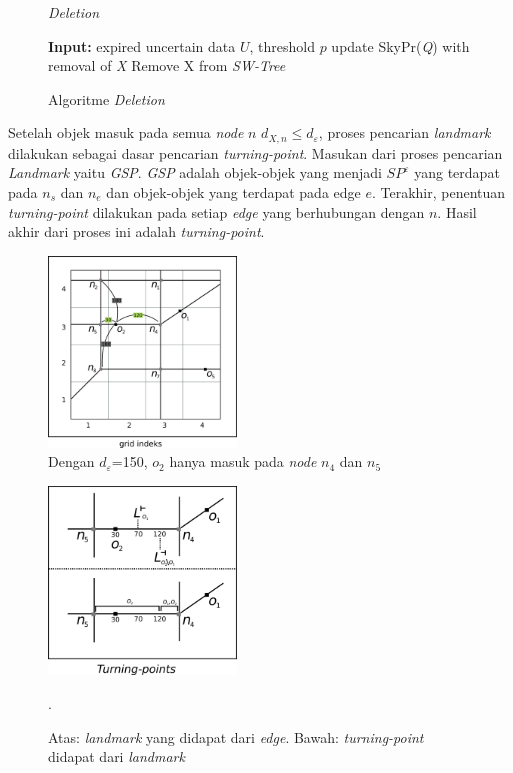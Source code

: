 \documentclass[conference]{IEEEtran}
\begin{document}
	\begin{figure}[H]
		\begin{algorithm}[H]
			\label{algo:deletion}
			\caption{\textit{Deletion}}
			\begin{algorithmic}[1]
				\State \textbf{Input: }expired uncertain data $ U $, threshold $ p $
				\State update SkyPr(\textit{Q}) with removal of \textit{X}
				\EndFor
				\State Remove X from \textit{SW-Tree}
			\end{algorithmic}
		\end{algorithm}
		\caption{Algoritme \textit{Deletion}}
	\end{figure}


Setelah objek masuk pada semua \textit{node} $ n $ $ d_{X, n} \le d_\varepsilon $, proses pencarian \textit{landmark} dilakukan sebagai dasar pencarian \textit{turning-point}. Masukan dari proses pencarian \textit{Landmark} yaitu \textit{GSP}. \textit{GSP} adalah objek-objek yang menjadi $ SP^\varepsilon $ yang terdapat pada $ n_s $ dan $ n_e $ dan objek-objek yang terdapat pada edge $ e $. Terakhir, penentuan \textit{turning-point} dilakukan pada setiap \textit{edge} yang berhubungan dengan $ n $. Hasil akhir dari proses ini adalah \textit{turning-point}.

\begin{figure}
	\centering
	\includegraphics[width=5cm]{imgs/alur/alur3.png}
	\caption{Dengan $ d_\varepsilon $=150, $ o_2 $ hanya masuk pada \textit{node} $ n_4 $ dan $ n_5 $}
	\label{fig:alur3}
\end{figure}

\begin{figure}
	\centering
	\includegraphics[width=5cm]{imgs/alur/alur6.png}
	\caption{Atas: \textit{landmark} yang didapat dari \textit{edge}. Bawah: \textit{turning-point} didapat dari \textit{landmark}}.
	\label{fig:alur4-5}
\end{figure}
\end{document}
